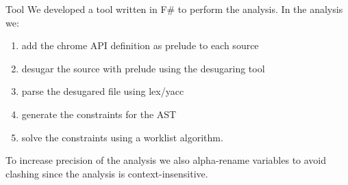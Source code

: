 \documentclass[11pt]{beamer}
\begin{document}
\begin{frame}{Tool}
We developed a tool written in F\# to perform the analysis. In the analysis we:
\begin{enumerate}
\item add the chrome API definition as prelude to each source
\item desugar the source with prelude using the desugaring tool \cite{LambdaJS}
\item parse the desugared file using lex/yacc
\item generate the constraints for the AST
\item solve the constraints using a worklist algorithm.
\end{enumerate}
To increase precision of the analysis we also alpha-rename variables to avoid clashing since the analysis is context-insensitive.
\end{frame}
\newcommand{\absCV}{\mathcal{CV}}
\newcommand{\cenvs}{\absCV}
\newcommand{\Cat}[0]{\absCV_{\hat{C}}}
\newcommand{\muat}[0]{\absCV_{\hat{\mu}}}
\newcommand{\Env}[0]{\absCV_{\hat{\Gamma}}}
\newcommand{\Pat}[0]{\absCV_{\hat{P}}}
\newcommand{\Phiat}[0]{\absCV_{\hat{\Phi}}}
\newcommand{\Upsat}[0]{\absCV_{\hat{\Upsilon}}}
\newcommand{\ccest}[1]{\cenvs \Vdash_{cv, \rho_s} #1}
\newcommand{\ccestl}[1]{\cenvs \Vdash_{cv, \rho_s} {(#1)}^{\alpha}}
\newcommand{\lbt}[1]{{e_#1}^{\alpha_#1}}
\newcommand{\all}{\alpha}
\end{document}
